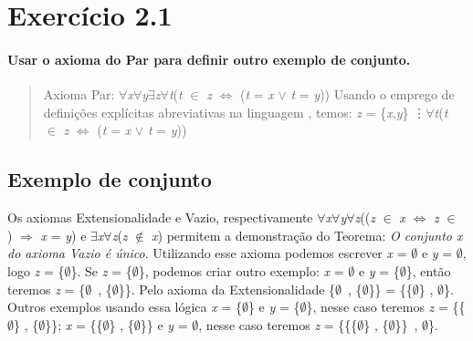 \section{Exercício 2.1}
\paragraph{Usar o axioma do Par para definir outro exemplo de conjunto.}

\begin{quote}
	Axioma Par: $\forall$\textit{x}$\forall$\textit{y}$\exists$\textit{z}$\forall$\textit{t}(\textit{t} $\in$ \textit{z} $\Leftrightarrow$ (\textit{t} = \textit{x} $\lor$ \textit{t} = \textit{y}))
	\newline
	Usando o emprego de definições explícitas abreviativas na linguagem , temos:
	\newline
	\textit{z} = \{\textit{x},\textit{y}\} \vdots\;$\forall$\textit{t}(\textit{t} $\in$ \textit{z} $\Leftrightarrow$ (\textit{t} = \textit{x} $\lor$ \textit{t} = \textit{y}))	
\end{quote}
\subsection{Exemplo de conjunto}
	Os axiomas Extensionalidade e Vazio, respectivamente $\forall$\textit{x}$\forall$\textit{y}$\forall$\textit{z}((\textit{z} $\in$ \textit{x} $\Leftrightarrow$ \textit{z} $\in$ ) $\Rightarrow$ \textit{x} = \textit{y})  e $\exists$\textit{x}$\forall$\textit{z}(\textit{z} $\notin$ \textit{x}) permitem a demonstração do Teorema: \textit{O conjunto x do axioma Vazio é único}.
	Utilizando esse axioma podemos escrever \textit{x} = $\emptyset$  e \textit{y} = $\emptyset$, logo \textit{z} = \{$\emptyset$\}. 
	\newline
	Se \textit{z} = \{$\emptyset$\}, podemos criar outro exemplo: \textit{x} = $\emptyset$  e \textit{y} = \{$\emptyset$\}, então teremos \textit{z} = \{$\emptyset$\ , \{$\emptyset$\}\}. Pelo axioma da Extensionalidade \{$\emptyset$\ , \{$\emptyset$\}\} = \{\{$\emptyset$\} , $\emptyset$\}.
	\newline
	Outros exemplos usando essa lógica \textit{x} = \{$\emptyset$\}  e \textit{y} = \{$\emptyset$\}, nesse caso teremos  \textit{z} = \{\{$\emptyset$\} , \{$\emptyset$\}\};
	\newline
	\textit{x} = \{\{$\emptyset$\} , \{$\emptyset$\}\}  e \textit{y} = $\emptyset$, nesse caso teremos  \textit{z} = \{\{\{$\emptyset$\} , \{$\emptyset$\}\}\ , $\emptyset$\}.